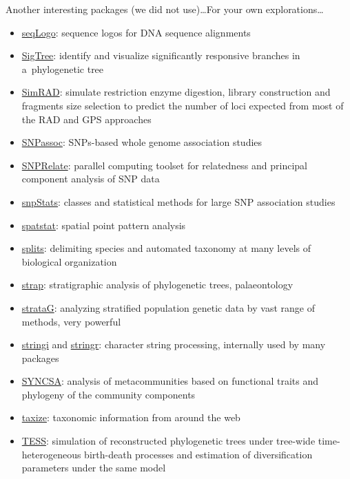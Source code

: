 \documentclass[compress, ucs, xelatex, 11pt, xcolor=svgnames, aspectratio=169,
	hyperref={
		bookmarks=true,
		unicode=true,
		colorlinks=true,
		pdftitle={Molecular data in R},
		plainpages=false,
		pdfauthor={Vojtech Zeisek},
		pdfsubject={Course about phylogeny and evolution in R},
		pdfcreator={XeLaTeX},
		pdfkeywords={R, evolution, phylogeny, molecular data},
		linkcolor=Crimson, %
		anchorcolor=Magenta, %
		citecolor=Magenta, %
		filecolor=Magenta, %
		menucolor=Magenta, %
		urlcolor=DodgerBlue, %
		pdftex},
	url={hyphens, lowtilde} %
	]{beamer}
\begin{document}
\begin{frame}[allowframebreaks]{Another interesting packages (we did not use)\ldots}{For your own explorations\ldots}
\begin{itemize}
		\item \href{https://www.bioconductor.org/packages/release/bioc/html/seqLogo.html}{seqLogo}: sequence logos for DNA sequence alignments
		\item \href{https://CRAN.R-project.org/package=SigTree}{SigTree}: identify and visualize significantly responsive branches in a~phylogenetic tree
		\item \href{https://CRAN.R-project.org/package=SimRAD}{SimRAD}: simulate restriction enzyme digestion, library construction and fragments size selection to predict the number of loci expected from most of the RAD and GPS approaches
		\item \href{https://CRAN.R-project.org/package=SNPassoc}{SNPassoc}: SNPs-based whole genome association studies
		\item \href{https://www.bioconductor.org/packages/release/bioc/html/SNPRelate.html}{SNPRelate}: parallel computing toolset for relatedness and principal component analysis of SNP data
		\item \href{https://bioconductor.org/packages/release/bioc/html/snpStats.html}{snpStats}: classes and statistical methods for large SNP association studies
		\item \href{https://CRAN.R-project.org/package=spatstat}{spatstat}: spatial point pattern analysis
		\item \href{https://r-forge.r-project.org/projects/splits/}{splits}: delimiting species and automated taxonomy at many levels of biological organization
		\item \href{https://CRAN.R-project.org/package=strap}{strap}: stratigraphic analysis of phylogenetic trees, palaeontology
		\item \href{https://github.com/cran/strataG}{strataG}: analyzing stratified population genetic data by vast range of methods, very powerful
		\item \href{https://CRAN.R-project.org/package=stringi}{stringi} and \href{https://CRAN.R-project.org/package=stringr}{stringr}: character string processing, internally used by many packages
		\item \href{https://CRAN.R-project.org/package=SYNCSA}{SYNCSA}: analysis of metacommunities based on functional traits and phylogeny of the community components
		\item \href{https://CRAN.R-project.org/package=taxize}{taxize}: taxonomic information from around the web
		\item \href{https://CRAN.R-project.org/package=TESS}{TESS}: simulation of reconstructed phylogenetic trees under tree-wide time-heterogeneous birth-death processes and estimation of diversification parameters under the same model

\end{itemize}
\end{frame}
\end{document}
